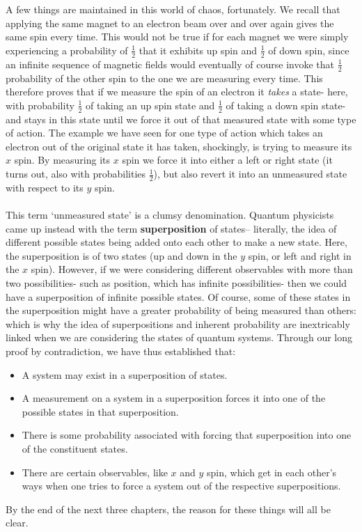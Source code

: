 \\\\
A few things are maintained in this world of chaos, fortunately. We recall that applying the same magnet to an electron beam over and over again gives the same spin every time. This would not be true if for each magnet we were simply experiencing a probability of $\frac{1}{2}$ that it exhibits up spin and $\frac{1}{2}$ of down spin, since an infinite sequence of magnetic fields would eventually of course invoke that $\frac{1}{2}$ probability of the other spin to the one we are measuring every time. This therefore proves that if we measure the spin of an electron it \textit{takes} a state- here, with probability $\frac{1}{2}$ of taking an up spin state and $\frac{1}{2}$ of taking a down spin state- and stays in this state until we force it out of that measured state with some type of action. The example we have seen for one type of action which takes an electron out of the original state it has taken, shockingly, is trying to measure its $x$ spin. By measuring its $x$ spin we force it into either a left or right state (it turns out, also with probabilities $\frac{1}{2}$), but also revert it into an unmeasured state with respect to its $y$ spin. 
\\\\
This term `unmeasured state' is a clumsy denomination. Quantum physicists came up instead with the term \textbf{superposition} of states-- literally, the idea of different possible states being added onto each other to make a new state. Here, the superposition is of two states (up and down in the $y$ spin, or left and right in the $x$ spin). However, if we were considering different observables with more than two possibilities- such as position, which has infinite possibilities- then we could have a superposition of infinite possible states. Of course, some of these states in the superposition might have a greater probability of being measured than others: which is why the idea of superpositions and inherent probability are inextricably linked when we are considering the states of quantum systems. Through our long proof by contradiction, we have thus established that:
\begin{itemize}
    \item A system may exist in a superposition of states.
    \item A measurement on a system in a superposition forces it into one of the possible states in that superposition.
    \item There is some probability associated with forcing that superposition into one of the constituent states.
    \item There are certain observables, like $x$ and $y$ spin, which get in each other's ways when one tries to force a system out of the respective superpositions.
\end{itemize}
By the end of the next three chapters, the reason for these things will all be clear. 
